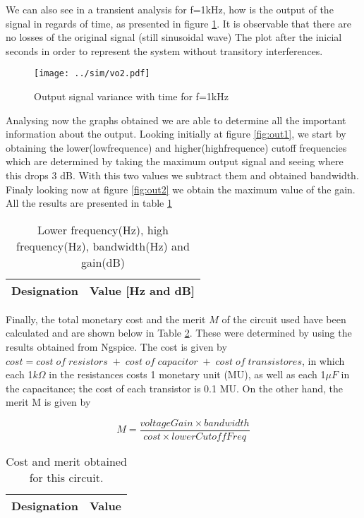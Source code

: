 We can also see in a transient analysis for f=1kHz, how is the output of the signal in regards of time, as presented in figure \ref{fig:outtime}. It is observable that there are no losses of the original signal (still sinusoidal wave)  The plot after the inicial seconds in order to represent the system without transitory interferences.
 \begin{figure}[H]
    \centering
  \texttt{[image: ../sim/vo2.pdf]}
  \caption{Output signal variance with time for f=1kHz}
 \vspace{-10mm}
  \label{fig:outtime}
\end{figure}

 

Analysing now the graphs obtained we are able to determine all the important information about the output. Looking initially at figure \ref{fig:out1}, we start by obtaining the lower(lowfrequence) and higher(highfrequence) cutoff frequencies which are determined by taking the maximum output signal and seeing where this drops 3 dB. With this two values we subtract them and obtained bandwidth. Finaly looking now at figure \ref{fig:out2} we obtain the maximum value of the gain. All the results are presented in table \ref{tab:rip}
\begin{table}[H]
  \centering
  \begin{tabular}{|c|c|}
    \hline
        {\bf Designation} & {\bf Value [Hz and dB]} \\ \hline
        
  \end{tabular}
  \caption{Lower frequency(Hz), high frequency(Hz), bandwidth(Hz) and gain(dB)} 
  \label{tab:rip}
\end{table}



Finally, the total monetary cost and the merit $M$ of the circuit used have been calculated and are shown below in Table \ref{tab:rip1}. These were determined by using the results obtained from Ngspice. The cost is given by $cost=cost\; of\; resistors\; +\; cost\; of\; capacitor\; +\; cost\; of\; transistores$, in which each 1$k\Omega$ in the resistances costs 1 monetary unit (MU), as well as each 1$\mu F$ in the capacitance; the cost of each transistor is 0.1 MU. On the other hand, the  merit M is given by

\begin{equation} \label{eq:merit}
  M=\frac{voltageGain \times bandwidth}{cost\times lowerCutoffFreq} 
\end{equation}


\begin{table}[H]
  \centering
  \begin{tabular}{|c|c|}
    \hline
        {\bf Designation} & {\bf Value} \\ \hline
        
  \end{tabular}
  \caption{Cost and merit obtained for this circuit.} 
  \label{tab:rip1}
\end{table}
